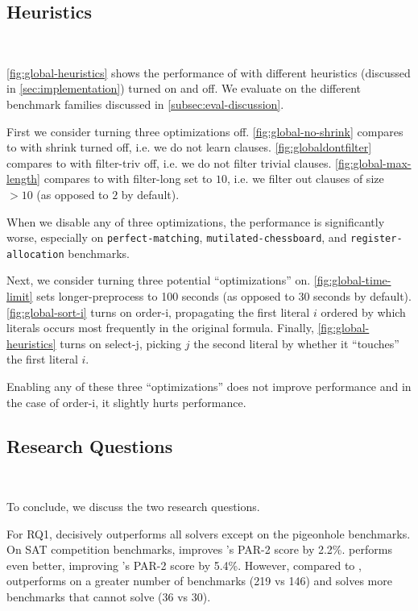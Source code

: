 \subsection{Heuristics}~\label{sec:heuristics}

\autoref{fig:global-heuristics} shows the performance of \tool with different
heuristics (discussed in \autoref{sec:implementation}) turned on and off. We
evaluate on the different benchmark families discussed in
\autoref{subsec:eval-discussion}.

First we consider turning three optimizations off.
\autoref{fig:global-no-shrink} compares \tool to \tool with
\textsf{shrink} turned off, i.e. we do not learn \pr clauses.
\autoref{fig:globaldontfilter} compares \tool to \tool with
\textsf{filter-triv} off, i.e. we do not filter trivial clauses.
\autoref{fig:global-max-length} compares \tool to \tool with
\textsf{filter-long} set to $10$, i.e. we filter out clauses of size $> 10$ (as
opposed to $2$ by default).

When we disable any of three optimizations, the performance is significantly
worse, especially on \texttt{perfect-matching}, \texttt{mutilated-chessboard},
and \texttt{register-allocation} benchmarks.

Next, we consider turning three potential ``optimizations'' on.
\autoref{fig:global-time-limit} sets \textsf{longer-preprocess} to 100 seconds
(as opposed to 30 seconds by default). \autoref{fig:global-sort-i} turns on
\textsf{order-i}, propagating the first literal $i$ ordered by which literals
occurs most frequently in the original formula. Finally,
\autoref{fig:global-heuristics} turns on \textsf{select-j}, picking $j$ the
second literal by whether it ``touches'' the first literal $i$.

Enabling any of these three ``optimizations'' does not improve performance and
in the case of \textsf{order-i}, it slightly hurts performance.

\subsection{Research Questions}~\label{subsec:researchquestions}

To conclude, we discuss the two research questions. 

For RQ1, \tool decisively outperforms all solvers except \sadical on the
pigeonhole benchmarks. On SAT competition benchmarks, \tool improves \cadical's
PAR-2 score by 2.2\%. \prelearn performs even better, improving \cadical's PAR-2
score by 5.4\%. However, compared to \prelearn, \tool outperforms \cadical on a
greater number of benchmarks (219 vs 146) and solves more benchmarks that
\cadical cannot solve (36 vs 30).

